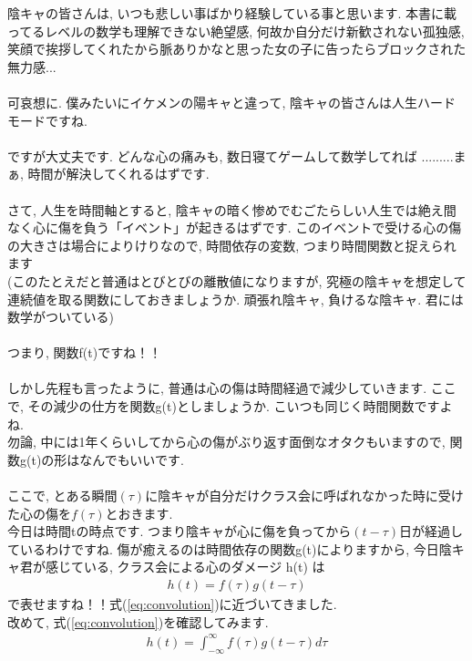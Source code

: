 \documentclass[11pt,a4paper,uplatex]{ujreport}
\begin{document}
陰キャの皆さんは, いつも悲しい事ばかり経験している事と思います. 本書に載ってるレベルの数学も理解できない絶望感, 何故か自分だけ新歓されない孤独感, 笑顔で挨拶してくれたから脈ありかなと思った女の子に告ったらブロックされた無力感...\\
\\
可哀想に. 僕みたいにイケメンの陽キャと違って, 陰キャの皆さんは人生ハードモードですね.\\
\\
ですが大丈夫です. どんな心の痛みも, 数日寝てゲームして数学してれば
.........まぁ, 時間が解決してくれるはずです. \\
\\
さて, 人生を時間軸とすると, 陰キャの暗く惨めでむごたらしい人生では絶え間なく心に傷を負う「イベント」が起きるはずです. このイベントで受ける心の傷の大きさは場合によりけりなので, 時間依存の変数, つまり時間関数と捉えられます\\
(このたとえだと普通はとびとびの離散値になりますが, 究極の陰キャを想定して連続値を取る関数にしておきましょうか. 頑張れ陰キャ, 負けるな陰キャ. 君には数学がついている)\\
\\
つまり, 関数f(t)ですね！！\\
\\
しかし先程も言ったように, 普通は心の傷は時間経過で減少していきます. ここで, その減少の仕方を関数g(t)としましょうか. こいつも同じく時間関数ですよね.\\
勿論, 中には1年くらいしてから心の傷がぶり返す面倒なオタクもいますので, 関数g(t)の形はなんでもいいです.\\
\\
ここで, とある瞬間$(\tau)$に陰キャが自分だけクラス会に呼ばれなかった時に受けた心の傷を$f(\tau)$とおきます.\\
今日は時間tの時点です. つまり陰キャが心に傷を負ってから$(t-\tau)$日が経過しているわけですね. 傷が癒えるのは時間依存の関数g(t)によりますから, 今日陰キャ君が感じている, クラス会による心のダメージ h(t) は
\begin{eqnarray}
\label{eq:inkya_otu}
h(t) = f(\tau) g(t-\tau)
\end{eqnarray}
で表せますね！！式(\ref{eq:convolution})に近づいてきました. \\
改めて, 式(\ref{eq:convolution})を確認してみます.
\begin{eqnarray}
h(t) = \int^{\infty}_{-\infty} f(\tau) g(t - \tau) d\tau
\end{eqnarray}
\end{document}
